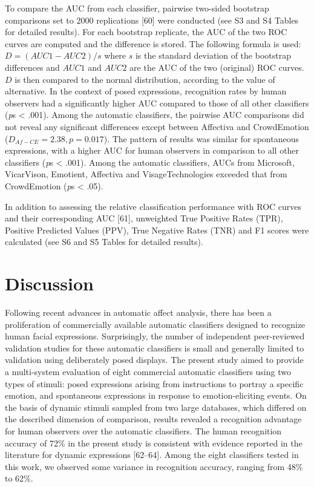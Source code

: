 \documentclass[10pt,letterpaper]{article}
\begin{document}
To compare the AUC from each classifier, pairwise two-sided bootstrap comparisons set to 2000 replications {[}60{]} were conducted (see S3 and S4 Tables for detailed results). For each bootstrap replicate, the AUC of the two ROC curves are computed and the difference is stored. The following formula is used: \(D = (AUC1-AUC2)/s\) where \(s\) is the standard deviation of the bootstrap differences and \(AUC1\) and \(AUC2\) are the AUC of the two (original) ROC curves. \(D\) is then compared to the normal distribution, according to the value of alternative. In the context of posed expressions, recognition rates by human observers had a significantly higher AUC compared to those of all other classifiers (\emph{p}s \textless{} .001). Among the automatic classifiers, the pairwise AUC comparisons did not reveal any significant differences except between Affectiva and CrowdEmotion (\(D_{Af-CE} = 2.38, p = 0.017\)). The pattern of results was similar for spontaneous expressions, with a higher AUC for human observers in comparison to all other classifiers (\emph{p}s \textless{} .001). Among the automatic classifiers, AUCs from Microsoft, VicarVison, Emotient, Affectiva and VisageTechnologies exceeded that from CrowdEmotion (\emph{p}s \textless{} .05).

In addition to assessing the relative classification performance with ROC curves and their corresponding AUC {[}61{]}, unweighted True Positive Rates (TPR), Positive Predicted Values (PPV), True Negative Rates (TNR) and F1 scores were calculated (see S6 and S5 Tables for detailed results).

\hypertarget{discussion}{%
\section*{Discussion}\label{discussion}}

Following recent advances in automatic affect analysis, there has been a proliferation of commercially available automatic classifiers designed to recognize human facial expressions. Surprisingly, the number of independent peer-reviewed validation studies for these automatic classifiers is small and generally limited to validation using deliberately posed displays. The present study aimed to provide a multi-system evaluation of eight commercial automatic classifiers using two types of stimuli: posed expressions arising from instructions to portray a specific emotion, and spontaneous expressions in response to emotion-eliciting events. On the basis of dynamic stimuli sampled from two large databases, which differed on the described dimension of comparison, results revealed a recognition advantage for human observers over the automatic classifiers. The human recognition accuracy of 72\% in the present study is consistent with evidence reported in the literature for dynamic expressions {[}62--64{]}. Among the eight classifiers tested in this work, we observed some variance in recognition accuracy, ranging from 48\% to 62\%.
\end{document}
